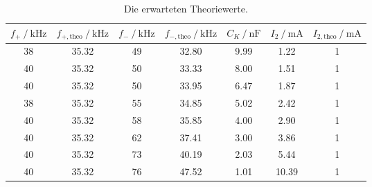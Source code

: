 \begin{table}
  \centering
  \caption{Die erwarteten Theoriewerte.}
  \label{tab:theorietabelle}
  \begin{tabular}{c c c c c c c}
      \toprule
      $f_+ \:/\: \si{\kilo\hertz}$ & $f_{+, \text{theo}} \:/\: \si{\kilo\hertz}$ & $f_- \:/\: \si{\kilo\hertz}$ & $f_{-, \text{theo}} \:/\: \si{\kilo\hertz}$ & $C_K \:/\: \si{\nano\farad}$ & $I_2 \:/\: \si{\milli\ampere}$ & $I_{2,\text{theo}} \:/\: \si{\milli\ampere}$ \\
      \midrule
      38 & 35.32 & 49 & 32.80 & 9.99 & 1.22 & 1 \\
      40 & 35.32 & 50 & 33.33 & 8.00 & 1.51 & 1 \\
      40 & 35.32 & 50 & 33.95 & 6.47 & 1.87 & 1 \\
      38 & 35.32 & 55 & 34.85 & 5.02 & 2.42 & 1 \\
      40 & 35.32 & 58 & 35.85 & 4.00 & 2.90 & 1 \\
      40 & 35.32 & 62 & 37.41 & 3.00 & 3.86 & 1 \\
      40 & 35.32 & 73 & 40.19 & 2.03 & 5.44 & 1 \\
      40 & 35.32 & 76 & 47.52 & 1.01 & 10.39 & 1 \\
      \bottomrule
  \end{tabular}
\end{table}

\pagebreak